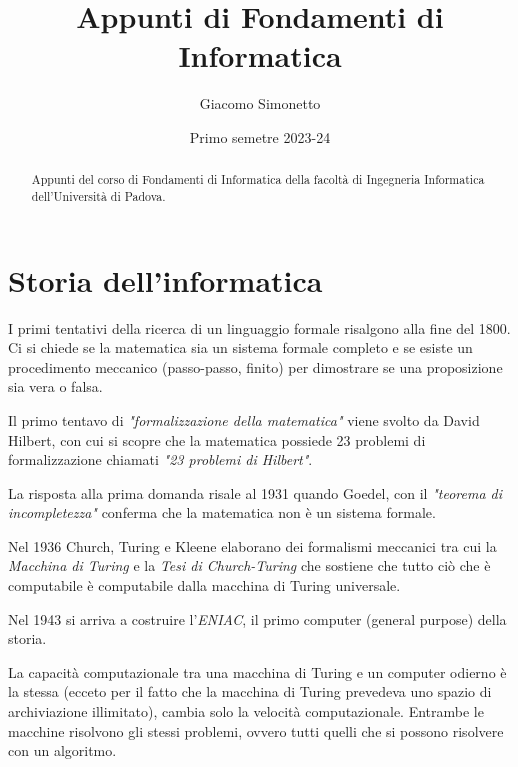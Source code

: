 \documentclass{article}
\title{Appunti di Fondamenti di Informatica}
\author{Giacomo Simonetto}
\date{Primo semetre 2023-24}
\begin{document}
\maketitle
\begin{abstract}
	Appunti del corso di Fondamenti di Informatica della facoltà di Ingegneria Informatica dell'Università di Padova.
\end{abstract}

\newpage

\tableofcontents

\newpage

\section{Storia dell'informatica}
I primi tentativi della ricerca di un linguaggio formale risalgono alla fine del 1800. Ci si chiede se la matematica
sia un sistema formale completo e se esiste un procedimento meccanico (passo-passo, finito) per dimostrare se una
proposizione sia vera o falsa.

Il primo tentavo di \textit{"formalizzazione della matematica"} viene svolto da David Hilbert, con cui si scopre che
la matematica possiede 23 problemi di formalizzazione chiamati \textit{"23 problemi di Hilbert"}.

La risposta alla prima domanda risale al 1931 quando Goedel, con il \textit{"teorema di incompletezza"} conferma che
la matematica non è un sistema formale.

Nel 1936 Church, Turing e Kleene elaborano dei formalismi meccanici tra cui la \textit{Macchina di Turing} e la
\textit{Tesi di Church-Turing} che sostiene che tutto ciò che è computabile è computabile dalla macchina di Turing
universale.

Nel 1943 si arriva a costruire l'\textit{ENIAC}, il primo computer (general purpose) della storia.

La capacità computazionale tra una macchina di Turing e un computer odierno è la stessa (ecceto per il
fatto che la macchina di Turing prevedeva uno spazio di archiviazione illimitato), cambia solo la velocità computazionale.
Entrambe le macchine risolvono gli stessi problemi, ovvero tutti quelli che si possono risolvere con un algoritmo.


\end{document}
